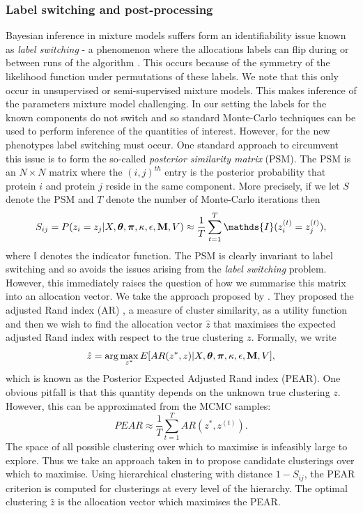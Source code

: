 \documentclass[12pt,english]{article}
\begin{document}
\subsubsection{Label switching and post-processing}
Bayesian inference in mixture models suffers form an identifiability issue known as \textit{label switching} - a phenomenon where the allocations labels can flip during or between runs of the algorithm \citep{Stephens:2000}. This occurs because of the symmetry of the likelihood function under permutations of these labels. We note that this only occur in unsupervised or semi-supervised mixture models. This makes inference of the parameters mixture model challenging. In our setting the labels for the known components do not switch and so standard Monte-Carlo techniques can be used to perform inference of the quantities of interest. However, for the new phenotypes label switching must occur. One standard approach to circumvent this issue is to form the so-called \textit{posterior similarity matrix} (PSM). The PSM is an $N\times N$ matrix where the $(i,j)^{th}$ entry is the posterior probability that protein $i$ and protein $j$ reside in the same component. More precisely, if we let $S$ denote the PSM and $T$ denote the number of Monte-Carlo iterations then 
\begin{equation}
S_{ij} = P(z_i = z_j| X, \boldsymbol{\theta}, \boldsymbol{\pi} , \kappa, \epsilon, {\bf M}, V) \approx \frac{1}{T} \sum_{t = 1}^{T} \mathds{I}(z^{(t)}_i = z^{(t)}_j),
\end{equation}
where $\mathds{I}$ denotes the indicator function. The PSM is clearly invariant to label switching and so avoids the issues arising from the \textit{label switching} problem. However, this immediately raises the question of how we summarise this matrix into an allocation vector. We take the approach proposed by \cite{fritsch::2009}. They proposed the adjusted Rand index (AR) \citep{rand::1971, Hubert::1985}, a measure of cluster similarity, as a utility function and then we wish to find the allocation vector $\hat{z}$ that maximises the expected adjusted Rand index with respect to the true clustering $z$. Formally, we write
\begin{equation}
\hat{z} = \arg \max_{z^*} E[AR(z^*, z)|X, \boldsymbol{\theta}, \boldsymbol{\pi} , \kappa, \epsilon, {\bf M}, V],
\end{equation}
which is known as the Posterior Expected Adjusted Rand index (PEAR). One obvious pitfall is that this quantity depends on the unknown true clustering $z$. However, this can be approximated from the MCMC samples:
\begin{equation}
PEAR \approx \frac{1}{T} \sum_{t = 1}^{T}AR(z^*, z^{(t)}).
\end{equation}
The space of all possible clustering over which to maximise is infeasibly large to explore. Thus we take an approach taken in \cite{fritsch::2009} to propose candidate clusterings over which to maximise. Using hierarchical clustering with distance $1 - S_{ij}$, the PEAR criterion is computed for clusterings at every level of the hierarchy. The optimal clustering $\hat{z}$ is the allocation vector which maximises the PEAR.
\end{document}
